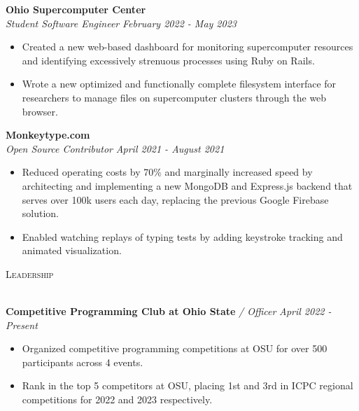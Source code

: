 \documentclass[letterpaper]{article}
\newcommand{\lineunder} {
    \vspace*{-8pt} \\
    \hspace*{-18pt} \hrulefill \\
}
\newcommand{\header} [1] {
    {\hspace*{-18pt}\vspace*{6pt} \textsc{#1}}
    \vspace*{-6pt} \lineunder
}
\begin{document}
    \textbf{Ohio Supercomputer Center}\\
    
    \textit{Student Software Engineer} \hfill \textsl{February 2022 - May 2023}\\
    \vspace{-7pt}
    \begin{itemize} \itemsep -1mm
        
            \item Created a new web-based dashboard for monitoring supercomputer resources and identifying excessively strenuous processes using Ruby on Rails.

            \item Wrote a new optimized and functionally complete filesystem interface for researchers to manage files on supercomputer clusters through the web browser.

    \end{itemize}
    \vspace{-2mm}

    	\textbf{Monkeytype.com}\\
    
    \textit{Open Source Contributor} \hfill \textsl{April 2021 - August 2021}\\
    \vspace{-7pt}
    \begin{itemize} \itemsep -1mm
            \item Reduced operating costs by 70\% and marginally increased speed by architecting and implementing a new MongoDB and Express.js backend that serves over 100k users each day, replacing the previous Google Firebase solution.

            \item Enabled watching replays of typing tests by adding keystroke tracking and animated visualization.

    \end{itemize}
    \vspace{-2mm}

\header{Leadership}
\vspace{1mm}

    \textbf{Competitive Programming Club at Ohio State} \textit{/ Officer} \hfill \textsl{April 2022 - Present}\\
    \vspace{-2mm}
    \begin{itemize} \itemsep -1mm
    
        \item Organized competitive programming competitions at OSU for over 500 participants across 4 events.
    
        \item Rank in the top 5 competitors at OSU, placing 1st and 3rd in ICPC regional competitions for 2022 and 2023 respectively.
    
    \end{itemize}
    \vspace{-1mm}
\end{document}
